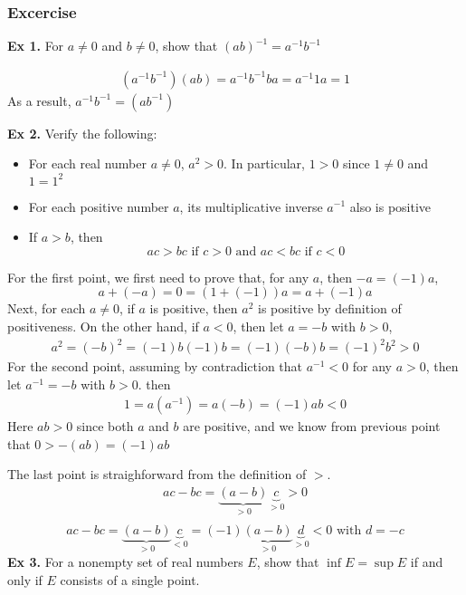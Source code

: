 \subsubsection{Excercise}

\textbf{Ex 1.} For $a \neq 0$ and $b \neq 0$, show that \((ab)^{-1} = a^{-1}b^{-1}\)

\begin{align*}
    (a^{-1}b^{-1}) (ab) = a^{-1}b^{-1} ba = a^{-1} 1 a = 1
\end{align*}
As a result, $a^{-1}b^{-1} = (ab^{-1})$

\noindent \textbf{Ex 2.} Verify the following:
\begin{itemize}
    \item For each real number $a \neq 0$, $a^2 > 0$. In particular, $1 > 0$ since $1 \neq 0$ and $1=1^2$
    \item For each positive number $a$, its multiplicative inverse $a^{-1}$ also is positive
    \item If $a > b$, then
        \begin{equation*}
            ac > bc \text{ if } c > 0 \text{ and } ac < bc \text{ if } c < 0
        \end{equation*}
\end{itemize}
For the first point, we first need to prove that, for any $a$, then $-a=(-1) a$, 
\begin{equation*}
    a + (-a) = 0 = (1 + (-1)) a = a + (-1) a
\end{equation*}
Next, for each $a \neq 0$, if $a$ is positive, then $a^2$ is positive by definition of positiveness. On the other hand, if $a<0$, then let $a = -b$ with $b > 0$, 
\begin{align}
    a^2 = (-b)^2 = (-1)b (-1) b = (-1) (-b) b = (-1)^2 b^2 > 0
\end{align}
For the second point, assuming by contradiction that $a^{-1} < 0$ for any $a>0$, then let $a^{-1} = -b$ with $b>0$. then
\begin{align*}
    1 = a(a^{-1}) = a (-b) = (-1) ab < 0
\end{align*}
Here $ab>0$ since both $a$ and $b$ are positive, and we know from previous point that $0 > -(ab) = (-1) ab$

The last point is straighforward from the definition of $>$.
\begin{align*}
    ac - bc = \underbrace{(a-b)}_{>0}\underbrace{c}_{>0} >0 \\
\end{align*}
\begin{equation*}
    ac - bc = \underbrace{(a-b)}_{>0}\underbrace{c}_{<0} = (-1) \underbrace{(a-b)}_{>0}\underbrace{d}_{>0} < 0 \text{ with } d = -c
\end{equation*}
\textbf{Ex 3.} For a nonempty set of real numbers $E$, show that $\inf E = \sup E$ if and only if $E$ consists of a single point.

